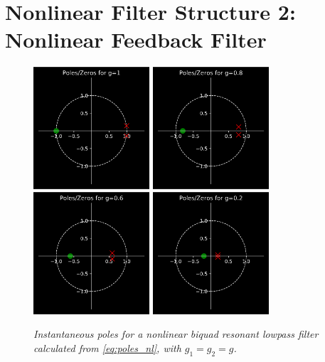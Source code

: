 \documentclass{IEEEtran}
\begin{document}
\section{Nonlinear Filter Structure 2: Nonlinear Feedback Filter}
%
\begin{figure}[ht]
    \includegraphics[width=1.7in]{../Pics/pz1.png}
    \includegraphics[width=1.7in]{../Pics/pz08.png}
    \includegraphics[width=1.7in]{../Pics/pz06.png}
    \includegraphics[width=1.7in]{../Pics/pz02.png}
    \caption{\label{pzPlots}{\it Instantaneous poles for a nonlinear biquad resonant
                                lowpass filter calculated from \cref{eq:poles_nl}, with
                                $g_1 = g_2 = g$.}}
\end{figure}
\end{document}
